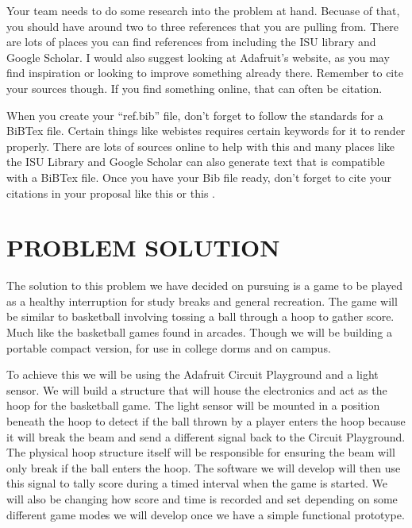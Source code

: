 \documentclass[12pt]{article}
\begin{document}
Your team needs to do some research into the problem at hand. Becuase of that, you should have around two to three references that you are pulling from. There are lots of places you can find references from including the ISU library and Google Scholar. I would also suggest looking at Adafruit's website, as you may find inspiration or looking to improve something already there. Remember to cite your sources though. If you find something online, that can often be citation.

When you create your ``ref.bib'' file, don't forget to follow the standards for a BiBTex file. Certain things like webistes requires certain keywords for it to render properly. There are lots of sources online to help with this and many places like the ISU Library and Google Scholar can also generate text that is compatible with a BiBTex file. Once you have your Bib file ready, don't forget to cite your citations in your proposal like this \cite{einstein} or this \cite{dirac}.

\section{PROBLEM SOLUTION}
The solution to this problem we have decided on pursuing is a game to be played as a healthy interruption for study breaks and general recreation. The game will be similar to basketball involving tossing a ball through a hoop to gather score. Much like the basketball games found in arcades. Though we will be building a portable compact version, for use in college dorms and on campus.

To achieve this we will be using the Adafruit Circuit Playground and a light sensor. We will build a structure that will house the electronics and act as the hoop for the basketball game. The light sensor will be mounted in a position beneath the hoop to detect if the ball thrown by a player enters the hoop because it will break the beam and send a different signal back to the Circuit Playground. The physical hoop structure itself will be responsible for ensuring the beam will only break if the ball enters the hoop. The software we will develop will then use this signal to tally score during a timed interval when the game is started. We will also be changing how score and time is recorded and set depending on some different game modes we will develop once we have a simple functional prototype.
\end{document}

